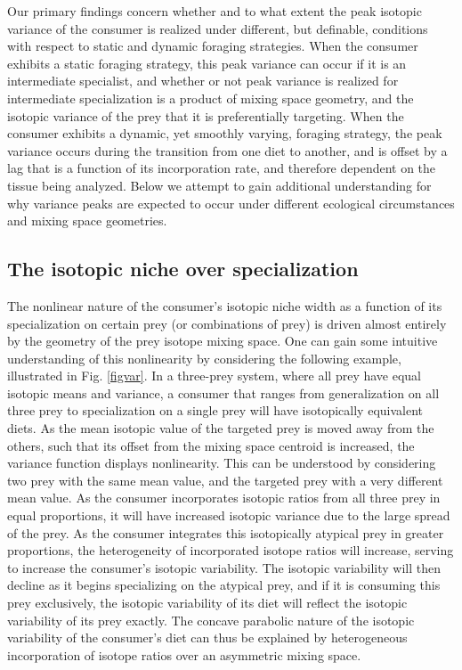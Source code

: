 \documentclass{frontiersSCNS}
\begin{document}
Our primary findings concern whether and to what extent the peak isotopic variance of the consumer is realized under different, but definable, conditions with respect to static and dynamic foraging strategies.
When the consumer exhibits a static foraging strategy, this peak variance can occur if it is an intermediate specialist, and whether or not peak variance is realized for intermediate specialization is a product of mixing space geometry, and the isotopic variance of the prey that it is preferentially targeting.
When the consumer exhibits a dynamic, yet smoothly varying, foraging strategy, the peak variance occurs during the transition from one diet to another, and is offset by a lag that is a function of its incorporation rate, and therefore dependent on the tissue being analyzed.
Below we attempt to gain additional understanding for why variance peaks are expected to occur under different ecological circumstances and mixing space geometries.


\subsection{The isotopic niche over specialization}

The nonlinear nature of the consumer's isotopic niche width as a function of its specialization on certain prey (or combinations of prey) is driven almost entirely by the geometry of the prey isotope mixing space.
One can gain some intuitive understanding of this nonlinearity by considering the following example, illustrated in Fig. \ref{figvar}.
In a three-prey system, where all prey have equal isotopic means and variance, a consumer that ranges from generalization on all three prey to specialization on a single prey will have isotopically equivalent diets.
As the mean isotopic value of the targeted prey is moved away from the others, such that its offset from the mixing space centroid is increased, the variance function displays nonlinearity.
This can be understood by considering two prey with the same mean value, and the targeted prey with a very different mean value.
As the consumer incorporates isotopic ratios from all three prey in equal proportions, it will have increased isotopic variance due to the large spread of the prey.
As the consumer integrates this isotopically atypical prey in greater proportions, the heterogeneity of incorporated isotope ratios will increase, serving to increase the consumer's isotopic variability.
The isotopic variability will then decline as it begins specializing on the atypical prey, and if it is consuming this prey exclusively, the isotopic variability of its diet will reflect the isotopic variability of its prey exactly.
The concave parabolic nature of the isotopic variability of the consumer's diet can thus be explained by heterogeneous incorporation of isotope ratios over an asymmetric mixing space.
\end{document}
